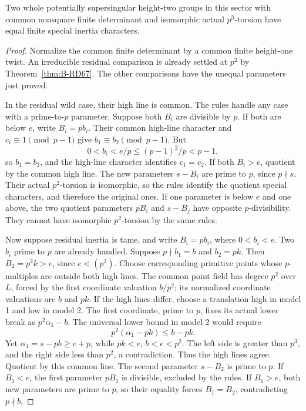 \begin{proposition}
\label{prop:B-RD68-nonsquare}
Two whole potentially supersingular height-two groups in this
sector with common nonsquare finite determinant and isomorphic
actual \(p^3\)-torsion have equal finite special inertia characters.
\end{proposition}
\begin{proof}
Normalize the common finite determinant by a common finite
height-one twist. An irreducible residual comparison is already
settled at \(p^2\) by Theorem~\ref{thm:B-RD67}.
The other comparisons have the unequal parameters just proved.

In the residual wild case, their high line is common.
The rules handle any case with a prime-to-\(p\) parameter.
Suppose both \(B_i\) are divisible by \(p\).
If both are below \(e\), write \(B_i=pb_i\).
Their common high-line character and \(c_i\equiv1\pmod{p-1}\)
give \(b_1\equiv b_2\pmod{p-1}\). But
\[
 0<b_i<e/p\le (p-1)^2/p<p-1,
 \tag{B-RD68.8}
\]
so \(b_1=b_2\), and the high-line character identifies \(c_1=c_2\).
If both \(B_i>e\), quotient by the common high line.
The new parameters \(s-B_i\) are prime to \(p\), since \(p\nmid s\).
Their actual \(p^2\)-torsion is isomorphic, so the rules identify
the quotient special characters, and therefore the original ones.
If one parameter is below \(e\) and one above, the two quotient
parameters \(pB_i\) and \(s-B_j\) have opposite \(p\)-divisibility.
They cannot have isomorphic \(p^2\)-torsion by the same rules.

Now suppose residual inertia is tame, and write \(B_i=pb_i\),
where \(0<b_i<e\). Two \(b_i\) prime to \(p\) are already
handled. Suppose \(p\nmid b_1=b\) and \(b_2=pk\).
Then \(B_2=p^2k>e\), since \(e<(p^2)\).
Choose corresponding primitive points whose \(p\)-multiples
are outside both high lines. The common point field has degree
\(p^2\) over \(L\), forced by the first coordinate valuation
\(b/p^2\); its normalized coordinate valuations are \(b\) and \(pk\).
If the high lines differ, choose a translation high in model 1
and low in model 2. The first coordinate, prime to \(p\), fixes
its actual lower break as \(p^2\alpha_1-b\).
The universal lower bound in model 2 would require
\[
 p^2(\alpha_1-pk)\le b-pk .
 \tag{B-RD68.9}
\]
Yet \(\alpha_1=s-pb\ge e+p\), while \(pk<e\), \(b<e<p^2\).
The left side is greater than \(p^3\), and the right side less
than \(p^2\), a contradiction. Thus the high lines agree.
Quotient by this common line. The second parameter \(s-B_2\)
is prime to \(p\). If \(B_1<e\), the first parameter \(pB_1\)
is divisible, excluded by the rules. If \(B_1>e\), both new
parameters are prime to \(p\), so their equality forces
\(B_1=B_2\), contradicting \(p\nmid b\).


\end{proof}
